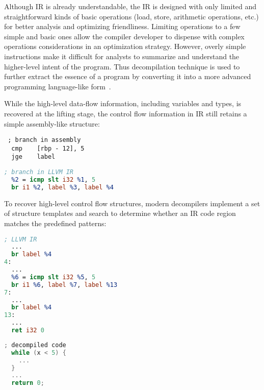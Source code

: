 Although IR is already understandable, the IR is designed with only limited
and straightforward kinds of basic operations (load, store, arithmetic
operations, etc.) for better analysis and optimizing friendliness. Limiting
operations to a few simple and basic ones allow the compiler developer to
dispense with complex operations considerations in an optimization strategy.
However, overly simple instructions make it difficult for analysts to
summarize and understand the higher-level intent of the program. Thus
decompilation technique is used to further extract the essence of a program by
converting it into a more advanced programming language-like
form~\cite{van2007static,fokin2010reconstruction,engel2011enhanced,brumley2013native}.

While the high-level data-flow information, including variables and types, is
recovered at the lifting stage, the control flow information in IR still
retains a simple assembly-like structure:

\vspace*{3pt}
\noindent\hspace*{36pt}\begin{minipage}{.40\linewidth}
\begin{lstlisting}
 ; branch in assembly
  cmp	 [rbp - 12], 5
  jge	 label
\end{lstlisting}
\end{minipage}\hspace*{24pt}
\begin{minipage}{.40\linewidth}
\begin{lstlisting}[language=llvm]
 ; branch in LLVM IR
  %2 = icmp slt i32 %1, 5
  br i1 %2, label %3, label %4
\end{lstlisting}
\end{minipage}

To recover high-level control flow structures, modern decompilers implement a
set of structure templates and search to determine whether an IR code region
matches the predefined patterns:

\vspace*{3pt}
\noindent\hspace*{36pt}\begin{minipage}{.40\linewidth}
\begin{lstlisting}[language=llvm]
 ; LLVM IR
  ...
  br label %4
4:
  ...
  %6 = icmp slt i32 %5, 5
  br i1 %6, label %7, label %13
7:
  ...
  br label %4
13:
  ...
  ret i32 0
\end{lstlisting}
\end{minipage}\hspace*{24pt}
\begin{minipage}{.40\linewidth}
\begin{lstlisting}[language=C]
 ; decompiled code
  while (x < 5) {
    ...
  }
  ...
  return 0;
\end{lstlisting}
\end{minipage}

